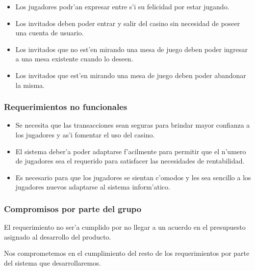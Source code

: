 \begin{itemize}

\item {} 

 Los jugadores podr'an expresar entre s'i su felicidad por estar jugando.

\item {} 

 Los invitados deben poder entrar y salir del casino sin necesidad de poseer una cuenta de usuario.

\item {} 

 Los invitados que no est'en mirando una mesa de juego deben poder ingresar a una mesa existente cuando lo deseen.

\item {}

 Los invitados que est'en mirando una mesa de juego deben poder abandonar la misma.

\end{itemize}



\subsubsection{Requerimientos no funcionales}

\begin{itemize}

\item {} 

 Se necesita que las transacciones sean seguras para brindar mayor confianza a los jugadores y as'i fomentar el uso del casino.

\item {} 

 El sistema deber'a poder adaptarse f'acilmente para permitir que el n'umero de jugadores sea el requerido para satisfacer las necesidades de rentabilidad.

\item {} 

 Es necesario para que los jugadores se sientan c'omodos y les sea sencillo a los jugadores nuevos adaptarse al sistema inform'atico.

\end{itemize}


\subsubsection{Compromisos por parte del grupo}

El requerimiento  no ser'a cumplido por no llegar a un acuerdo en el presupuesto asignado al desarrollo del producto.

Nos comprometemos en el cumplimiento del resto de los requerimientos por parte del sistema que desarrollaremos.
